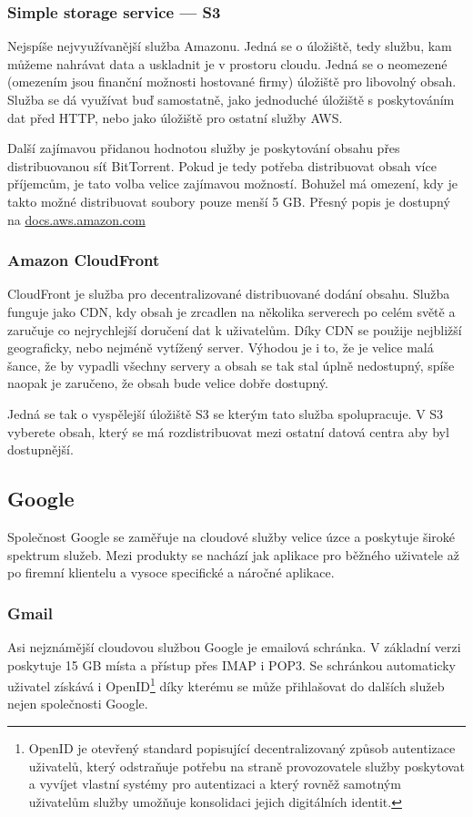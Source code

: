 \subsubsection{Simple storage service --- S3}
Nejspíše nejvyužívanější služba Amazonu. Jedná se o úložiště, tedy službu, kam můžeme nahrávat data a uskladnit je v prostoru cloudu. Jedná se o neomezené (omezením jsou finanční možnosti hostované firmy) úložiště pro libovolný obsah. Služba se dá využívat buď samostatně, jako jednoduché úložiště s poskytováním dat před HTTP, nebo jako úložiště pro ostatní služby AWS.

Další zajímavou přidanou hodnotou služby je poskytování obsahu přes distribuovanou síť BitTorrent. Pokud je tedy potřeba distribuovat obsah více příjemcům, je tato volba velice zajímavou možností. Bohužel má omezení, kdy je takto možné distribuovat soubory pouze menší 5 GB. Přesný popis je dostupný na \href{http://docs.aws.amazon.com/AmazonS3/latest/dev/S3Torrent.html}{docs.aws.amazon.com}

\subsubsection{Amazon CloudFront}
CloudFront je služba pro decentralizované distribuované dodání obsahu. Služba funguje jako CDN, kdy obsah je zrcadlen na několika serverech po celém světě a zaručuje co nejrychlejší doručení dat k uživatelům. Díky CDN se použije nejbližší geograficky, nebo nejméně vytížený server. Výhodou je i to, že je velice malá šance, že by vypadli všechny servery a obsah se tak stal úplně nedostupný, spíše naopak je zaručeno, že obsah bude velice dobře dostupný.

Jedná se tak o vyspělejší úložiště S3 se kterým tato služba spolupracuje. V S3 vyberete obsah, který se má rozdistribuovat mezi ostatní datová centra aby byl dostupnější.

\subsection{Google}
Společnost Google se zaměřuje na cloudové služby velice úzce a poskytuje široké spektrum služeb. Mezi produkty se nachází jak aplikace pro běžného uživatele až po firemní klientelu a vysoce specifické a náročné aplikace.

\subsubsection{Gmail}
Asi nejznámější cloudovou službou Google je emailová schránka. V základní verzi poskytuje 15 GB místa a přístup přes IMAP i POP3. Se schránkou automaticky uživatel získává i OpenID\footnote{OpenID je otevřený standard popisující decentralizovaný způsob autentizace uživatelů, který odstraňuje potřebu na straně provozovatele služby poskytovat a vyvíjet vlastní systémy pro autentizaci a který rovněž samotným uživatelům služby umožňuje konsolidaci jejich digitálních identit.\cite{wiki:openID}} díky kterému se může přihlašovat do dalších služeb nejen společnosti Google.

